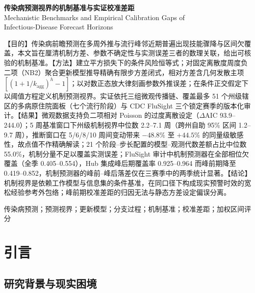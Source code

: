 \documentclass[10pt,UTF8,a4paper,zihao=-4]{ctexart}
\theoremstyle{plain}
\theoremstyle{remark}
\begin{document}
\setcounter{section}{-1}

\begin{center}
    \vspace*{-0.6em}
    {\heiti\bfseries 传染病预测视界的机制基准与实证校准差距} \\[0.5em]
    {\kaishu Mechanistic Benchmarks and Empirical Calibration Gaps of\\ Infectious-Disease Forecast Horizons}
\end{center}

{\small
{}【目的】传染病前瞻预测在多周外推与流行峰邻近期普遍出现技能骤降与区间欠覆盖，本文旨在厘清机制方差、参数不确定性与实测误差三者的数理关联，给出可核验的机制基准。【方法】建立平方损失下的条件风险恒等式；对固定离散度周度负二项（NB2）聚合更新模型推导精确有限步方差闭式，相对方差含几何发散主项 $[(1+1/k_{\text{agg}})^h-1]$；以对数正态放大律刻画参数外推误差；在条件正交假定下以阈值方程定义机制预测视界。实证依托三组微观传播链、覆盖最多 51 个州级辖区的多病原住院面板（七个流行阶段）与 CDC FluSight 三个锁定赛季的版本化审计。【结果】微观数据支持负二项相对 Poisson 的过度离散设定（$\Delta\text{AIC}$ 93.9--244.0）；5 周基准窗口下州级机制视界中位数 2.2--7.1 周（跨州自助 95\% 区间 1.2--9.7 周），推断窗口在 5/6/8/10 周间变动带来 $-48.8\%$ 至 $+44.5\%$ 的同量级敏感性，故点值不作精确解读；21 个阶段--步长配置的模型--观测代数差额占比中位数 55.0\%，机制分量不足以覆盖实测误差；FluSight 审计中机制预测器在全部相位欠覆盖（全季 0.405--0.554），Hub 集成峰后期覆盖率 0.925--0.964 而峰前期降至 0.419--0.852，机制预测器的峰前--峰后落差仅在三赛季中的两季统计显著。【结论】机制视界是依赖工作模型与信息集的条件基准，在同口径下构成现实预警时效的宽松经验参考外包络；峰前期校准差距的归因无法与静态方差设定偏误分离。

\vspace{0.3em}
传染病预测；预测视界；更新模型；分支过程；机制基准；校准差距；加权区间评分
}

\vspace{0.4em}

\section{引言}\label{sec:intro}

\subsection{研究背景与现实困境}
\end{document}
